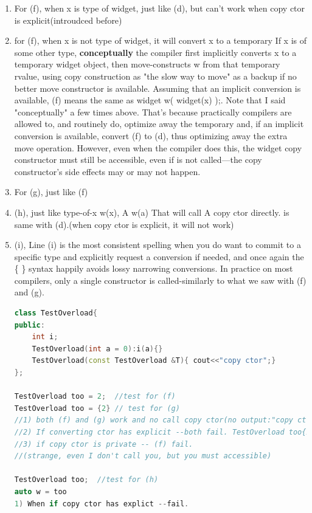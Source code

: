 \documentclass[a4paper,12pt,twoside]{book}
\begin{document}
\begin{itemize}
\begin{enumerate}
		\item For (f), when x is type of widget, just like (d), but can't work when copy ctor is explicit(introudced before)
		
		\item for (f), when x is not type of widget, it will convert x to a temporary If x is of some other type, \textbf{conceptually} the compiler first implicitly converts x to a temporary widget object, then move-constructs w from that temporary rvalue, using copy construction as "the slow way to move" as a backup if no better move constructor is available. Assuming that an implicit conversion is available, (f) means the same as widget w( widget(x) );. Note that I said "conceptually" a few times above. That's because practically compilers are allowed to, and routinely do, optimize away the temporary and, if an implicit conversion is available, convert (f) to (d), thus optimizing away the extra move operation. However, even when the compiler does this, the widget copy constructor must still be accessible, even if is not called—the copy constructor's side effects may or may not happen.

		\item For (g), just like (f)
		
		\item (h), just like type-of-x w(x), A w(a) That will call A copy ctor directly. is same with (d).(when copy ctor is explicit, it will not work)
		
		\item (i), Line (i) is the most consistent spelling when you do want to commit to a specific type and explicitly request a conversion if needed, and once again the \{ \} syntax happily avoids lossy narrowing conversions. In practice on most compilers, only a single constructor is called-similarly to what we saw with (f) and (g).
		
\begin{lstlisting}[frame=single, language=c++,mathescape=true]
class TestOverload{
public:
	int i;
	TestOverload(int a = 0):i(a){}
	TestOverload(const TestOverload &T){ cout<<"copy ctor";} 
};
		
TestOverload too = 2;  //test for (f) 
TestOverload too = {2} // test for (g)
//1) both (f) and (g) work and no call copy ctor(no output:"copy ctor")
//2) If converting ctor has explicit --both fail. TestOverload too{2} --succeed.
//3) if copy ctor is private -- (f) fail.
//(strange, even I don't call you, but you must accessible)
		
TestOverload too;  //test for (h)
auto w = too
1) When if copy ctor has explict --fail.


\end{lstlisting}
\end{enumerate}
\end{itemize}
\end{document}
